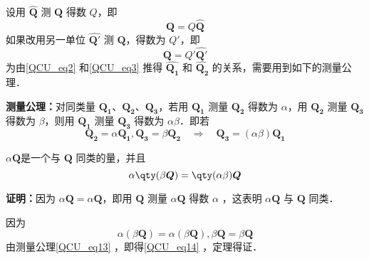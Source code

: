 设用 $\hat{\boldsymbol{Q}}$ 测 $\boldsymbol{Q}$ 得数 $Q$，即
\begin{equation}\label{QCU_eq2}
\boldsymbol{Q}=Q\hat{\boldsymbol{Q}}
\end{equation}
如果改用另一单位 $\hat{\boldsymbol{Q'}}$ 测 $\boldsymbol{Q}$，得数为 $Q'$，即
\begin{equation}\label{QCU_eq3}
\boldsymbol{Q}=Q'\hat{\boldsymbol{Q'}}
\end{equation}
为由\autoref{QCU_eq2} 和\autoref{QCU_eq3} 推得 $\hat{\boldsymbol{Q_1}}$ 和 $\hat{\boldsymbol{Q_2}}$ 的关系，需要用到如下的测量公理．

\textbf{测量公理：}对同类量 $\boldsymbol{Q_1}$、$\boldsymbol{Q_2}$、$\boldsymbol{Q_3}$，若用 $\boldsymbol{Q_1}$ 测量 $\boldsymbol{Q_2}$ 得数为 $\alpha$，用 $\boldsymbol{Q_2}$ 测量 $\boldsymbol{Q_3}$ 得数为 $\beta$，则用 $\boldsymbol{Q_1}$ 测量 $\boldsymbol{Q_3}$ 得数为 $\alpha\beta$．即若
\begin{equation}\label{QCU_eq13}
\boldsymbol{Q_2}=\alpha\boldsymbol{Q_1},\boldsymbol{Q_3}=\beta\boldsymbol{Q_2}\quad\Rightarrow \quad\boldsymbol{Q_3}=(\alpha\beta)\boldsymbol{Q_1}
\end{equation}

\begin{theorem}{}\label{QCU_the2}
$\alpha \boldsymbol{Q}$是一个与 $\boldsymbol{Q}$ 同类的量，并且
\begin{equation}\label{QCU_eq14}
\alpha\qty(\beta \boldsymbol{Q})=\qty(\alpha\beta)\boldsymbol Q
\end{equation}
\end{theorem}
\textbf{证明：}因为 $\alpha\boldsymbol{Q}=\alpha\boldsymbol{Q}$，即用 $\boldsymbol{Q}$ 测量 $\alpha\boldsymbol{Q}$ 得数 $\alpha$ ，这表明 $\alpha\boldsymbol{Q}$ 与 $\boldsymbol{Q}$ 同类．

因为
\begin{equation}
\alpha(\beta\boldsymbol{Q})=\alpha(\beta\boldsymbol{Q}),\beta\boldsymbol{Q}=\beta\boldsymbol{Q}
\end{equation}
由测量公理\autoref{QCU_eq13} ，即得\autoref{QCU_eq14} ，定理得证．

